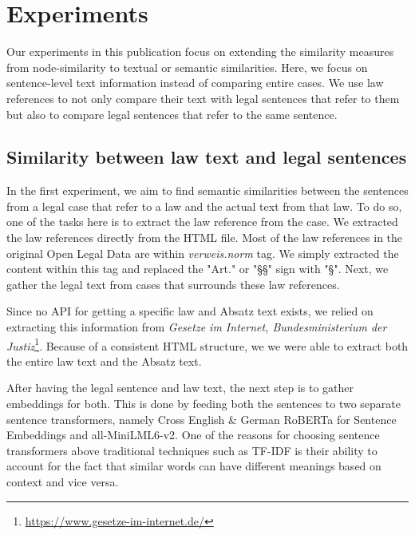 \documentclass[runningheads]{llncs}
\begin{document}

\section{Experiments}
\label{sec:experiment}

Our experiments in this publication focus on extending the similarity measures from node-similarity to textual or semantic similarities. Here, we focus on sentence-level text information instead of comparing entire cases. We use law references to not only compare their text with legal sentences that refer to them but also to compare legal sentences that refer to the same sentence.

\subsection{Similarity between law text and legal sentences}

In the first experiment, we aim to find semantic similarities between the sentences from a legal case that refer to a law and the actual text from that law. To do so, one of the tasks here is to extract the law reference from the case. We extracted the law references directly from the HTML file. Most of the law references in the original Open Legal Data are within \textit{verweis.norm} tag. We simply extracted the content within this tag and replaced the "Art." or "§§" sign with "§". Next, we gather the legal text from cases that surrounds these law references.

Since no API for getting a specific law and Absatz text exists, we relied on extracting this information from \textit{Gesetze im Internet, Bundesministerium der Justiz}\footnote{\url{https://www.gesetze-im-internet.de/}}. Because of a consistent HTML structure, we we were able to extract both the entire law text and the Absatz text. 

After having the legal sentence and law text, the next step is to gather embeddings for both. This is done by feeding both the sentences to two separate sentence transformers, namely Cross English \& German RoBERTa for Sentence Embeddings and all-MiniLML6-v2. One of the reasons for choosing sentence transformers above traditional techniques such as TF-IDF is their ability to account for the fact that similar words can have different meanings based on context and vice versa.
\end{document}
